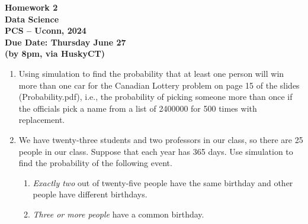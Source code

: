 \documentclass[12pt]{article}
\begin{document}
\begin{center}\Large\bf
  Homework 2\\ Data Science\\ PCS – Uconn, 2024\\
  Due Date: Thursday June 27\\ (by 8pm, via HuskyCT)
\end{center}

\begin{enumerate}[1.]
\item Using simulation to find the probability that at least one person will win more than
  one car for the Canadian Lottery problem on page 15 of the slides
  (Probability.pdf), i.e., the probability of picking someone more than once if
  the officials pick a name from a list of 2400000 for 500 times with
  replacement. 
\item We have twenty-three students and two professors in our class, so there
  are 25 people in our class. Suppose that each year has 365 days. Use
  simulation to find the probability of the following event.
\begin{enumerate}
\item \emph{Exactly two} out of twenty-five people have the same birthday and
  other people have different birthdays.
\item \emph{Three or more people} have a common birthday.
\end{enumerate}


\end{enumerate}
\end{document}
